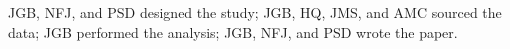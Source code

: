 JGB, NFJ, and PSD designed the study;
JGB, HQ, JMS, and AMC sourced the data;
JGB performed the analysis;
JGB, NFJ, and PSD wrote the paper.
